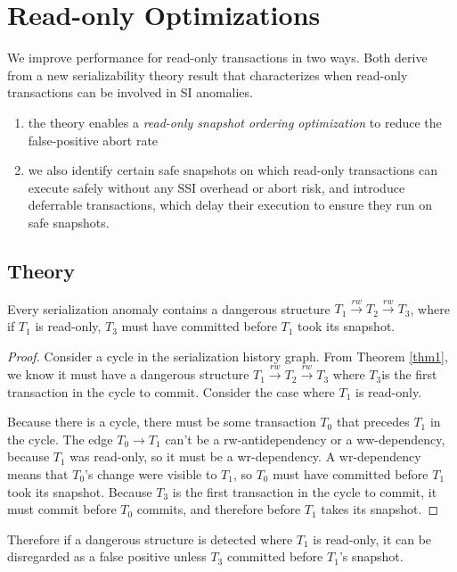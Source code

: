 \documentclass[11pt]{article}
\begin{document}
\section{Read-only Optimizations}
\label{sec:org31e5203}
We improve performance for read-only transactions in two ways. Both derive from a new serializability
theory result that characterizes when read-only transactions can be involved in SI  anomalies.
\begin{enumerate}
\item the theory enables a \emph{read-only snapshot ordering optimization} to reduce the false-positive abort rate
\item we also identify certain safe snapshots on which read-only transactions can execute safely without
any SSI overhead or abort risk, and introduce deferrable transactions, which delay their execution
to ensure they run on safe snapshots.
\end{enumerate}
\subsection{Theory}
\label{sec:orgc969404}
\begin{theorem}[]
Every serialization anomaly contains a dangerous structure
\(T_1\xrightarrow{rw}T_2\xrightarrow{rw}T_3\), where if \(T_1\) is read-only, \(T_3\) must have
committed before \(T_1\) took its snapshot.
\end{theorem}

\begin{proof}
Consider a cycle in the serialization history graph. From Theorem \ref{thm1}, we know it must have a
dangerous structure \(T_1\xrightarrow{rw}T_2\xrightarrow{rw}T_3\) where \(T_3\)is the first
transaction in the cycle to commit. Consider the case where \(T_1\) is read-only.

Because there is a cycle, there must be some transaction \(T_0\) that precedes \(T_1\) in the cycle.
The edge \(T_0\to T_1\) can't be a rw-antidependency or a ww-dependency, because \(T_1\) was
read-only, so it must be a wr-dependency. A wr-dependency means that \(T_0\)'s change were visible to
\(T_1\), so \(T_0\) must have committed before \(T_1\) took its snapshot. Because \(T_3\) is the first
transaction in the cycle to commit, it must commit before \(T_0\) commits, and therefore before
\(T_1\) takes its snapshot.
\end{proof}

Therefore if a dangerous structure is detected where \(T_1\) is read-only, it can be disregarded as a
false positive unless \(T_3\) committed before \(T_1\)'s snapshot.
\end{document}
